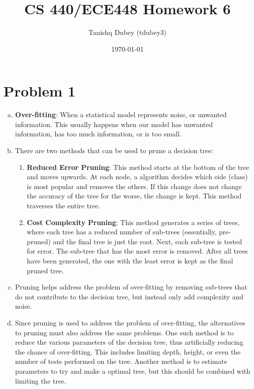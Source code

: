 \documentclass[12pt]{article}%
\begin{document}
\title{CS 440/ECE448 Homework 6}
\author{Tanishq Dubey (tdubey3)}
\date{\today}
\maketitle
\section*{Problem 1}
    \begin{enumerate}[a)]
        \item
            \textbf{Over-fitting}: When a statistical model represents noise, or unwanted information. This usually happens when our model has unwanted information, has too much information, or is too small.
        \item
            There are two methods that can be used to prune a decision tree:
            \begin{enumerate}[1.]
                \item \textbf{Reduced Error Pruning}: This method starts at the bottom of the tree and moves upwards. At each node, a algorithm decides which side (class) is most popular and removes the others. If this change does not change the accuracy of the tree for the worse, the change is kept. This method traverses the entire tree.
                 \item \textbf{Cost Complexity Pruning}: This method generates a series of trees, where each tree has a reduced number of sub-trees (essentially, pre-pruned) and the final tree is just the root. Next, each sub-tree is tested for error. The sub-tree that has the most error is removed. After all trees have been generated, the one with the least error is kept as the final pruned tree.
            \end{enumerate}
        \item
            Pruning helps address the problem of over-fitting by removing sub-trees that do not contribute to the decision tree, but instead only add complexity and noise.
        \item
            Since pruning is used to address the problem of over-fitting, the alternatives to pruning must also address the same problems. One such method is to reduce the various parameters of the decision tree, thus artificially reducing the chance of over-fitting. This includes limiting depth, height, or even the number of tests performed on the tree. Another method is to estimate parameters to try and make a optimal tree, but this should be combined with limiting the tree.
    \end{enumerate}
\end{document}
